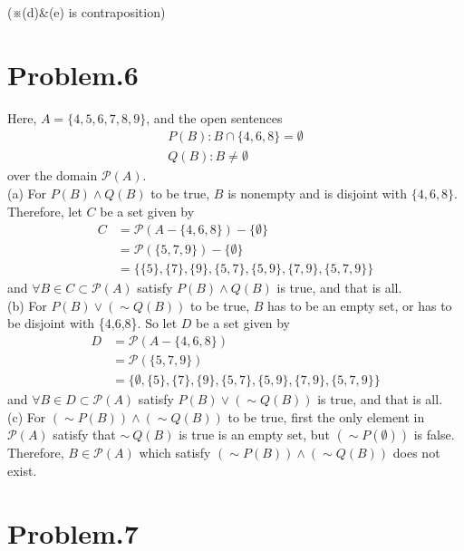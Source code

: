 \documentclass[12pt]{article}
\begin{document}
(※(d)\&(e) is contraposition)
\section*{Problem.6}
Here, $A = \{4,5,6,7,8,9\}$, and the open sentences\\[1em]
\begin{gather*}
P(B): B \cap \{4,6,8\} = \emptyset\\[1em]
Q(B): B \neq \emptyset
\end{gather*}
over the domain $\mathcal{P}(A)$.\\[1em]
(a) For $P(B) \land Q(B)$ to be true,
$B$ is nonempty and is disjoint with $\{4,6,8\}$.
Therefore, let $C$ be a set given by
\begin{align*}
C &= \mathcal{P}(A-\{4,6,8\}) - \{\emptyset\}\\[1em]
&= \mathcal{P}(\{5,7,9\}) - \{\emptyset\}\\[1em]
&= \{\{5\},\{7\},\{9\},\{5,7\},\{5,9\},\{7,9\},\{5,7,9\}\}
\end{align*}
and $\forall B \in C \subset \mathcal{P}(A)$ satisfy $P(B) \land Q(B)$ is true, and that is all.\\[1em]
(b) For $P(B) \lor (\sim Q(B))$ to be true,
$B$ has to be an empty set, or has to be disjoint with \{4,6,8\}.
So let $D$ be a set given by
\begin{align*}
D &= \mathcal{P}(A-\{4,6,8\})\\[1em]
&= \mathcal{P}(\{5,7,9\})\\[1em]
&= \{\emptyset,\{5\},\{7\},\{9\},\{5,7\},\{5,9\},\{7,9\},\{5,7,9\}\}
\end{align*}
and $\forall B \in D \subset \mathcal{P}(A)$ satisfy $P(B) \lor (\sim Q(B))$ is true, and that is all.\\[1em]
(c) For $(\sim P(B)) \land (\sim Q(B))$ to be true,
first the only element in $\mathcal{P}(A)$ satisfy that $\sim
~Q(B)$ is true is an empty set, but $(\sim P(\emptyset))$ is false. Therefore, $B \in \mathcal{P}(A)$ which satisfy $(\sim P(B)) \land (\sim Q(B))$ does not exist.
\section*{Problem.7}
\end{document}
